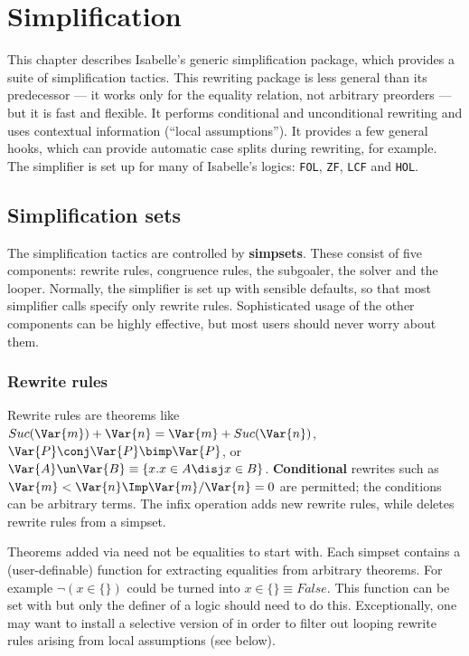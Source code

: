 \chapter{Simplification} \label{simp-chap}


This chapter describes Isabelle's generic simplification package, which
provides a suite of simplification tactics.  This rewriting package is less
general than its predecessor --- it works only for the equality relation,
not arbitrary preorders --- but it is fast and flexible.  It performs
conditional and unconditional rewriting and uses contextual information
(``local assumptions'').  It provides a few general hooks, which can
provide automatic case splits during rewriting, for example.  The
simplifier is set up for many of Isabelle's logics: {\tt FOL}, {\tt ZF},
{\tt LCF} and {\tt HOL}.


\section{Simplification sets}

The simplification tactics are controlled by {\bf simpsets}.  These consist
of five components: rewrite rules, congruence rules, the subgoaler, the
solver and the looper.  Normally, the simplifier is set up with sensible
defaults, so that most simplifier calls specify only rewrite rules.
Sophisticated usage of the other components can be highly effective, but
most users should never worry about them.

\subsection{Rewrite rules}

Rewrite rules are theorems like $Suc(\Var{m}) + \Var{n} = \Var{m} +
Suc(\Var{n})$, $\Var{P}\conj\Var{P} \bimp \Var{P}$, or $\Var{A} \un \Var{B}
\equiv \{x.x\in A \disj x\in B\}$.  {\bf Conditional} rewrites such as
$\Var{m}<\Var{n} \Imp \Var{m}/\Var{n} = 0$ are permitted; the conditions
can be arbitrary terms.  The infix operation  adds new
rewrite rules, while  deletes rewrite rules from a
simpset.

Theorems added via  need not be equalities to start with.
Each simpset contains a (user-definable) function for extracting equalities
from arbitrary theorems.  For example $\neg(x\in \{\})$ could be turned
into $x\in \{\} \equiv False$.  This function can be set with
 but only the definer of a logic should need to do
this.  Exceptionally, one may want to install a selective version of
 in order to filter out looping rewrite rules arising from
local assumptions (see below).

